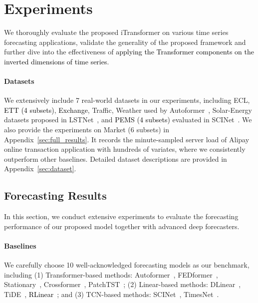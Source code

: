 \documentclass{article} %
\newcommand{\update}[1]{{\textcolor{black}{#1}}}
\begin{document}
\section{Experiments}

We thoroughly evaluate the proposed iTransformer on various time series forecasting applications, validate the generality of the proposed framework and further dive into the effectiveness of \update{applying the Transformer components on the inverted dimensions of time series}.

\paragraph{Datasets} 
We extensively include 7 real-world datasets in our experiments, including ECL, \update{ETT (4 subsets)}, \update{Exchange}, Traffic, Weather used by Autoformer~\citep{Autoformer}, Solar-Energy datasets proposed in LSTNet~\citep{LSTNet}, and \update{PEMS (4 subsets)} evaluated in SCINet~\citep{SCINet}. We also provide the experiments on Market (6 subsets) in Appendix~\ref{sec:full_results}. It records the minute-sampled server load of Alipay 
online transaction application with hundreds of variates, where we consistently outperform other baselines. Detailed dataset descriptions are provided in Appendix~\ref{sec:dataset}.

\subsection{Forecasting Results}
In this section, we conduct extensive experiments to evaluate the forecasting performance of our proposed model together with advanced deep forecasters. 

\paragraph{Baselines} We carefully choose 10 well-acknowledged forecasting models as our benchmark, including (1) Transformer-based methods: Autoformer~\citep{Autoformer}, FEDformer~\citep{fedformer}, Stationary~\citep{Stationary}, Crossformer~\citep{Crossformer}, PatchTST~\citep{PatchTST}; (2) Linear-based methods: DLinear~\citep{DLinear}, TiDE~\citep{das2023long}, \update{RLinear~\citep{li2023revisiting}}; and (3) TCN-based methods: SCINet~\citep{SCINet}, TimesNet~\citep{Timesnet}.
\end{document}
